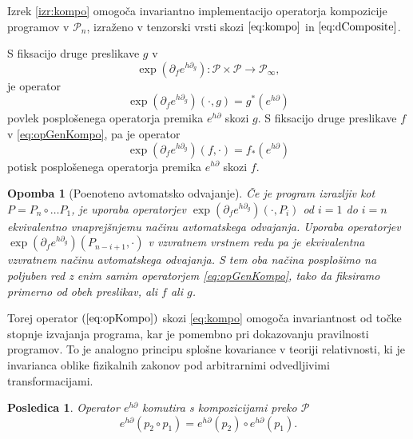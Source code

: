 \documentclass[a4paper, 12pt]{book}
\newcommand{\ed}{e^{h\partial}}
\newcommand{\dP}{\mathcal{P}}
\newcommand{\D}{\partial}
\newtheorem{posledica}{Posledica}[chapter]
\newtheorem{opomba}{Opomba}[chapter]
\begin{document}
 \noindent Izrek \ref{izr:kompo} omogoča invariantno implementacijo operatorja kompozicije programov v $\dP_n$, izraženo v tenzorski vrsti skozi $\eqref{eq:kompo}$ in $\eqref{eq:dComposite}$.
 
  \noindent S fiksacijo druge preslikave $g$ v  
   \begin{equation}\label{eq:opGenKompo}
  \exp(\D_fe^{h\D_g}): \dP\times\dP\to\dP_\infty,
   \end{equation}
   je operator
   \begin{equation}
    \exp(\D_fe^{h\D_g})(\cdot,g)=g^*\left( e^{h\D} \right)\label{eq:opKompo}
  \end{equation}
  povlek posplošenega operatorja premika $\ed$ skozi $g$. S fiksacijo druge preslikave $f$ v \eqref{eq:opGenKompo}, pa je operator
    \begin{equation}
   \exp(\D_fe^{h\D_g})(f,\cdot)=f_*\left( e^{h\D} \right)\label{eq:opKompoForward}
   \end{equation}
potisk posplošenega operatorja premika $\ed$ skozi $f$.

\begin{opomba}[Poenoteno avtomatsko odvajanje]
\label{trd:reverseForward}
Če je program izrazljiv kot $P=P_n\circ\ldots P_1$, je uporaba operatorjev
  $\exp(\D_fe^{h\D_g})(\cdot,P_i)$ od $i=1$ do $i=n$ ekvivalentno \emph{vnaprejšnjemu načinu avtomatskega odvajanja}.
  Uporaba operatorjev $\exp(\D_fe^{h\D_g})(P_{n-i+1},\cdot)$ v vzvratnem vrstnem redu pa je ekvivalentna \emph{vzvratnem načinu  avtomatskega odvajanja}.
  S tem oba načina posplošimo na poljuben red z enim samim operatorjem \eqref{eq:opGenKompo}, tako da fiksiramo primerno od obeh preslikav, ali $f$ ali $g$.
\end{opomba}

Torej operator $(\ref{eq:opKompo})$ skozi \eqref{eq:kompo} omogoča invariantnost od točke stopnje izvajanja programa, kar je pomembno pri dokazovanju pravilnosti programov. To je analogno principu splošne kovariance \cite{GeneralCovariance} v teoriji relativnosti, ki je invarianca oblike fizikalnih zakonov pod arbitrarnimi odvedljivimi transformacijami.

\begin{posledica}\label{izr:komp_homo}
   Operator $e^{h\D}$ komutira s kompozicijami preko $\dP$
   \begin{equation*}
   e^{h\D}(p_2\circ p_1)=e^{h\D}(p_2)\circ e^{h\D}(p_1).
   \end{equation*}
   \end{posledica}
   
\end{document}
